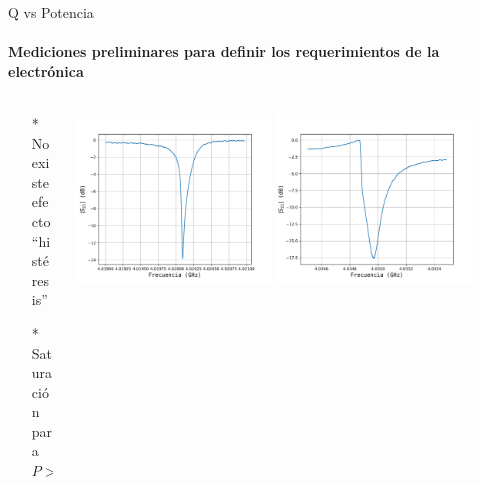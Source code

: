 \documentclass[ignorenonframetext,12pt]{beamer}
\begin{document}
		\begin{frame}{Q vs Potencia}
			\framesubtitle{Mediciones preliminares para definir los requerimientos
			de la electrónica}
			\begin{columns}
				\begin{column}{0.35\textwidth}
					\footnotesize{\begin{itemize}
						\item[*] No existe efecto ``histéresis'' 
						\item[*] Saturación para $P > -65\,\text{dB}$
					\end{itemize}}
				\end{column}
				\begin{column}{0.65\textwidth}
					\centering
					\includegraphics[width=0.45\textwidth]{un_resonador0_des_filtro}
					\includegraphics[width=0.45\textwidth]{un_resonador1_des_filtro}
				\end{column}
			\end{columns}


\end{frame}
\end{document}
